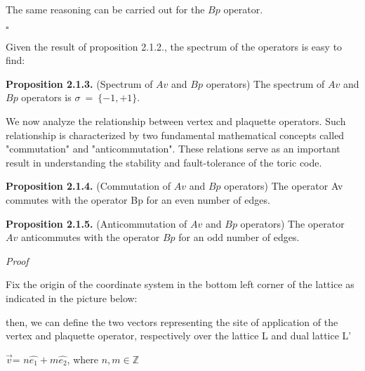 \documentclass[12pt]{report}
\begin{document}
	\begin{minipage}{1\textwidth}
		
		The same reasoning can be carried out for the $Bp$ operator.
		
		\hfill $\square$ \newline
		
		Given the result of proposition 2.1.2., the spectrum of the operators is easy to find:	\newline
		
		\textbf{Proposition 2.1.3.} (Spectrum of $Av$ and $Bp$ operators) The spectrum of $Av$ and $Bp$ operators is $ \sigma \ = \ \{-1,+1\}$. \newline
		
		We now analyze the relationship between vertex and plaquette operators. Such relationship is characterized by two fundamental mathematical concepts called "commutation" and "anticommutation". These relations serve as an important result in understanding the stability and fault-tolerance of the toric code.	\newline
		
		\textbf{Proposition 2.1.4.} (Commutation of $Av$ and $Bp$ operators) The operator Av commutes with the operator Bp for an even number of edges.
		\newline
		
		\textbf{Proposition 2.1.5.} (Anticommutation of $Av$ and $Bp$ operators) The operator $Av$ anticommutes with the operator $Bp$ for an odd number of edges.
		\newline
		
		\textit{Proof}\newline 
		
		Fix the origin of the coordinate system in the bottom left corner of the lattice as indicated in the picture below:\newline
		
		
		then, we can define the two vectors representing the site of application of the vertex and plaquette operator, respectively over the lattice L and dual lattice L'
		
		\begin{center}
			$\vec{v}$= $n\hat{e_1} + m\hat{e_2}$, where $n,m \in \mathbb{Z}$ \newline
			

\end{center}
\end{minipage}
\end{document}
